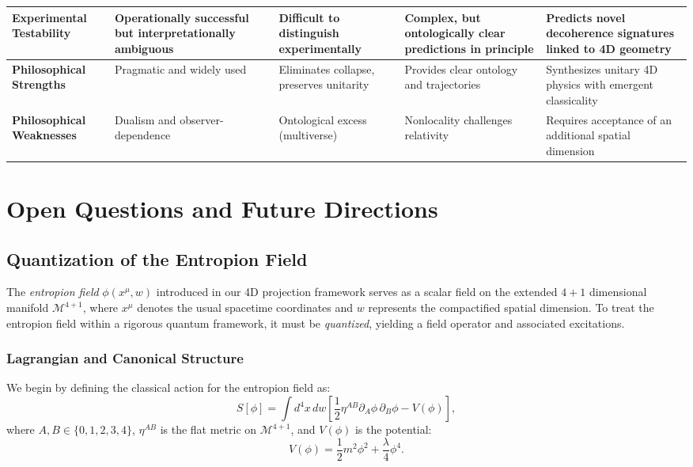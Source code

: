 \documentclass[12pt]{article}
\begin{document}
\begin{table}[ht]
{\begin{tabular}{|p{4cm}|p{3.5cm}|p{3.5cm}|p{3.5cm}|p{4cm}|}
\hline
\textbf{Experimental Testability} & Operationally successful but interpretationally ambiguous & Difficult to distinguish experimentally & Complex, but ontologically clear predictions in principle & Predicts novel decoherence signatures linked to 4D geometry \\
\hline
\textbf{Philosophical Strengths} & Pragmatic and widely used & Eliminates collapse, preserves unitarity & Provides clear ontology and trajectories & Synthesizes unitary 4D physics with emergent classicality \\
\hline
\textbf{Philosophical Weaknesses} & Dualism and observer-dependence & Ontological excess (multiverse) & Nonlocality challenges relativity & Requires acceptance of an additional spatial dimension \\
\hline
\end{tabular}%
}
\end{table}



\section{Open Questions and Future Directions}

\subsection{Quantization of the Entropion Field}

The \emph{entropion field} $\phi(x^\mu, w)$ introduced in our 4D projection framework serves as a scalar field on the extended \(4+1\) dimensional manifold \( \mathcal{M}^{4+1} \), where \( x^\mu \) denotes the usual spacetime coordinates and \( w \) represents the compactified spatial dimension. To treat the entropion field within a rigorous quantum framework, it must be \emph{quantized}, yielding a field operator and associated excitations.

\subsubsection*{Lagrangian and Canonical Structure}

We begin by defining the classical action for the entropion field as:
\begin{equation}
S[\phi] = \int d^4x \, dw \left[ \frac{1}{2} \eta^{AB} \partial_A \phi \, \partial_B \phi - V(\phi) \right],
\label{eq:entropion_action}
\end{equation}
where \( A, B \in \{0,1,2,3,4\} \), \( \eta^{AB} \) is the flat metric on \( \mathcal{M}^{4+1} \), and \( V(\phi) \) is the potential:
\begin{equation}
V(\phi) = \frac{1}{2} m^2 \phi^2 + \frac{\lambda}{4} \phi^4.
\label{eq:entropion_potential}
\end{equation}
\end{document}
